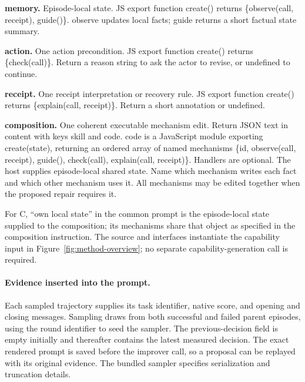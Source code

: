 \noindent\textbf{memory.} Episode-local state. JS export function create() returns \{observe(call, receipt), guide()\}. observe updates local facts; guide returns a short factual state summary.\par

\noindent\textbf{action.} One action precondition. JS export function create() returns \{check(call)\}. Return a reason string to ask the actor to revise, or undefined to continue.\par

\noindent\textbf{receipt.} One receipt interpretation or recovery rule. JS export function create() returns \{explain(call, receipt)\}. Return a short annotation or undefined.\par

\noindent\textbf{composition.} One coherent executable mechanism edit. Return JSON text in content with keys skill and code. code is a JavaScript module exporting create(state), returning an ordered array of named mechanisms \{id, observe(call, receipt), guide(), check(call), explain(call, receipt)\}. Handlers are optional. The host supplies episode-local shared state. Name which mechanism writes each fact and which other mechanism uses it. All mechanisms may be edited together when the proposed repair requires it.\par

For C, ``own local state'' in the common prompt is the episode-local state supplied to the composition; its mechanisms share that object as specified in the composition instruction. The source and interfaces instantiate the capability input in Figure~\ref{fig:method-overview}; no separate capability-generation call is required.

\paragraph{Evidence inserted into the prompt.}
Each sampled trajectory supplies its task identifier, native score, and opening and closing messages. Sampling draws from both successful and failed parent episodes, using the round identifier to seed the sampler. The previous-decision field is empty initially and thereafter contains the latest measured decision. The exact rendered prompt is saved before the improver call, so a proposal can be replayed with its original evidence. The bundled sampler specifies serialization and truncation details.

